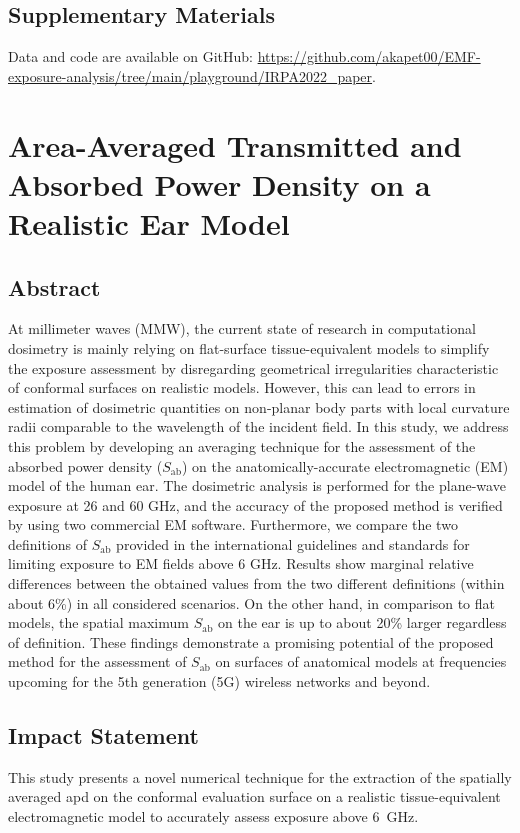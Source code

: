 \subsection{Supplementary Materials}
Data and code are available on GitHub: \url{https://github.com/akapet00/EMF-exposure-analysis/tree/main/playground/IRPA2022_paper}.

\section{Area-Averaged Transmitted and Absorbed Power Density on a Realistic Ear Model}
\label{sec:publication_3}
\subsection{Abstract}
At millimeter waves (MMW), the current state of research in computational dosimetry is mainly relying on flat-surface tissue-equivalent models to simplify the exposure assessment by disregarding geometrical irregularities characteristic of conformal surfaces on realistic models.
However, this can lead to errors in estimation of dosimetric quantities on non-planar body parts with local curvature radii comparable to the wavelength of the incident field.
In this study, we address this problem by developing an averaging technique for the assessment of the absorbed power density ($S_\text{ab}$) on the anatomically-accurate electromagnetic (EM) model of the human ear.
The dosimetric analysis is performed for the plane-wave exposure at 26 and 60 GHz, and the accuracy of the proposed method is verified by using two commercial EM software. Furthermore, we compare the two definitions of $S_\text{ab}$ provided in the international guidelines and standards for limiting exposure to EM fields above 6 GHz.
Results show marginal relative differences between the obtained values from the two different definitions (within about 6\%) in all considered scenarios.
On the other hand, in comparison to flat models, the spatial maximum $S_\text{ab}$ on the ear is up to about 20\% larger regardless of definition.
These findings demonstrate a promising potential of the proposed method for the assessment of $S_\text{ab}$ on surfaces of anatomical models at frequencies upcoming for the 5th generation (5G) wireless networks and beyond.

\subsection{Impact Statement}
This study presents a novel numerical technique for the extraction of the spatially averaged \gls{apd} on the conformal evaluation surface on a realistic tissue-equivalent electromagnetic model to accurately assess exposure above \SI{6}{\GHz}.

